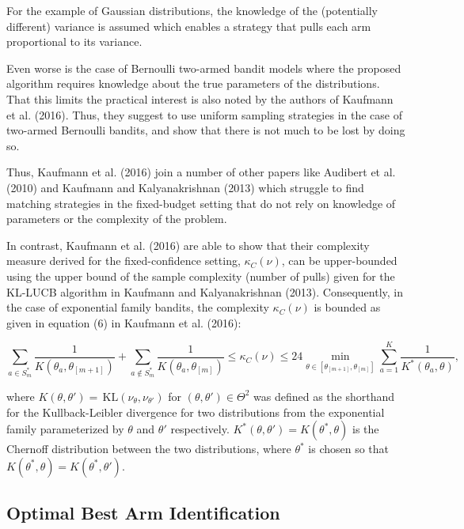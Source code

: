 \documentclass[12pt,]{article}
\newcommand{\KL}{\,\text{KL}}
\begin{document}
For the example of Gaussian distributions, the knowledge of the
(potentially different) variance is assumed which enables a strategy
that pulls each arm proportional to its variance.

Even worse is the case of Bernoulli two-armed bandit models where the
proposed algorithm requires knowledge about the true parameters of the
distributions. That this limits the practical interest is also noted by
the authors of Kaufmann et al. (2016). Thus, they suggest to use uniform
sampling strategies in the case of two-armed Bernoulli bandits, and show
that there is not much to be lost by doing so.

Thus, Kaufmann et al. (2016) join a number of other papers like Audibert
et al. (2010) and Kaufmann and Kalyanakrishnan (2013) which struggle to
find matching strategies in the fixed-budget setting that do not rely on
knowledge of parameters or the complexity of the problem.

In contrast, Kaufmann et al. (2016) are able to show that their
complexity measure derived for the fixed-confidence setting,
\(\kappa_C(\nu)\), can be upper-bounded using the upper bound of the
sample complexity (number of pulls) given for the KL-LUCB algorithm in
Kaufmann and Kalyanakrishnan (2013). Consequently, in the case of
exponential family bandits, the complexity \(\kappa_C(\nu)\) is bounded
as given in equation (6) in Kaufmann et al. (2016):

\begin{equation*}
\sum_{a \in S^*_m} \frac{1}{K(\theta_a, \theta_{[m+1]})} + \sum_{a \notin S^*_m} \frac{1}{K(\theta_a,\theta_{[m]})} \leq \kappa_C(\nu) \leq 24 \min_{\theta \in [\theta_{[m+1]},\theta_{[m]}]} \sum_{a=1}^{K} \frac{1}{K^*(\theta_a, \theta)},
\end{equation*}

where \(K(\theta, \theta') = \KL(\nu_{\theta}, \nu_{\theta'})\) for
\((\theta, \theta') \in \Theta^2\) was defined as the shorthand for the
Kullback-Leibler divergence for two distributions from the exponential
family parameterized by \(\theta\) and \(\theta'\) respectively.
\(K^*(\theta,\theta') = K(\theta^*, \theta)\) is the Chernoff
distribution between the two distributions, where \(\theta^*\) is chosen
so that \(K(\theta^*,\theta) = K(\theta^*, \theta')\).

\subsection{Optimal Best Arm
Identification}\label{optimal-best-arm-identification}
\end{document}
